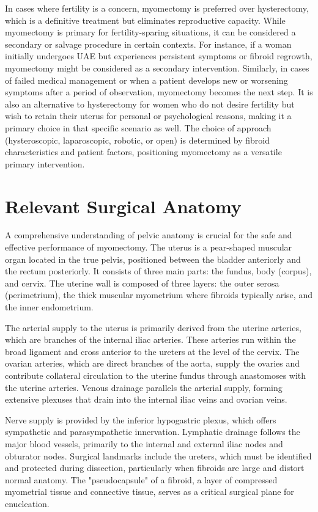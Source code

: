 In cases where fertility is a concern, myomectomy is preferred over hysterectomy, which is a definitive treatment but eliminates reproductive capacity. While myomectomy is primary for fertility-sparing situations, it can be considered a secondary or salvage procedure in certain contexts. For instance, if a woman initially undergoes UAE but experiences persistent symptoms or fibroid regrowth, myomectomy might be considered as a secondary intervention. Similarly, in cases of failed medical management or when a patient develops new or worsening symptoms after a period of observation, myomectomy becomes the next step. It is also an alternative to hysterectomy for women who do not desire fertility but wish to retain their uterus for personal or psychological reasons, making it a primary choice in that specific scenario as well. The choice of approach (hysteroscopic, laparoscopic, robotic, or open) is determined by fibroid characteristics and patient factors, positioning myomectomy as a versatile primary intervention.

\section*{Relevant Surgical Anatomy}
A comprehensive understanding of pelvic anatomy is crucial for the safe and effective performance of myomectomy. The uterus is a pear-shaped muscular organ located in the true pelvis, positioned between the bladder anteriorly and the rectum posteriorly. It consists of three main parts: the fundus, body (corpus), and cervix. The uterine wall is composed of three layers: the outer serosa (perimetrium), the thick muscular myometrium where fibroids typically arise, and the inner endometrium. 

The arterial supply to the uterus is primarily derived from the uterine arteries, which are branches of the internal iliac arteries. These arteries run within the broad ligament and cross anterior to the ureters at the level of the cervix. The ovarian arteries, which are direct branches of the aorta, supply the ovaries and contribute collateral circulation to the uterine fundus through anastomoses with the uterine arteries. Venous drainage parallels the arterial supply, forming extensive plexuses that drain into the internal iliac veins and ovarian veins. 

Nerve supply is provided by the inferior hypogastric plexus, which offers sympathetic and parasympathetic innervation. Lymphatic drainage follows the major blood vessels, primarily to the internal and external iliac nodes and obturator nodes. Surgical landmarks include the ureters, which must be identified and protected during dissection, particularly when fibroids are large and distort normal anatomy. The "pseudocapsule" of a fibroid, a layer of compressed myometrial tissue and connective tissue, serves as a critical surgical plane for enucleation.

